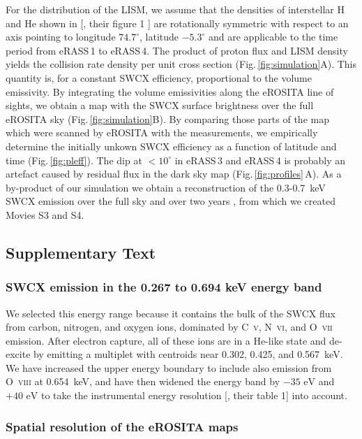 \documentclass[12pt]{article}
\renewcommand{\deg}{^{\circ}}
\newcommand{\erass}{eRASS\,}
\begin{document}
For the distribution of the LISM, we assume that the densities of interstellar H and He shown in [\cite{rin21a}, their figure 1 ] are rotationally symmetric with respect to an axis pointing to longitude $74.7\deg$, latitude $-5.3\deg$ \cite{moe04a} and are applicable to the time period from \erass1 to \erass4. The product of proton flux and LISM density yields  the collision rate density per unit cross section (Fig.\,\ref{fig:simulation}A). This quantity is, for a constant SWCX efficiency, proportional to the volume emissivity. By integrating the volume emissivities along the eROSITA line of sights, we obtain a map with the SWCX surface brightness over the full eROSITA sky (Fig.\,\ref{fig:simulation}B). By comparing those parts of the map which were scanned by eROSITA with the measurements, we empirically determine the initially unkown SWCX efficiency as a function of latitude and time (Fig.\,\ref{fig:pleff}). The dip at $<10\deg$ in \erass3 and \erass4 is probably an artefact caused by residual flux in the dark sky map (Fig.\,\ref{fig:profiles}\,A). As a by-product of our simulation we obtain a reconstruction of the 0.3-0.7~keV SWCX emission over the full sky and over two years \cite{code:runsim}, from which we created Movies S3 and S4.



\subsection*{Supplementary Text}

\subsubsection*{SWCX emission in the 0.267 to 0.694 keV energy band}

We selected this energy range because it contains the bulk of the SWCX flux from carbon, nitrogen, and oxygen ions, dominated by C~\textsc{v}, N~\textsc{vi}, and O~\textsc{vii} emission. After electron capture, all of these ions are in a He-like state and de-excite by emitting a multiplet with centroids near 0.302, 0.425, and 0.567~keV. We have increased the upper energy boundary to include also emission from O~\textsc{viii} at 0.654~keV, and have then widened the energy band by $-35\mbox{ eV}$ and $+40\mbox{ eV}$ to take the instrumental energy resolution [\cite{den20a}, their table 1] into account.

\subsubsection*{Spatial resolution of the eROSITA maps}
\end{document}
